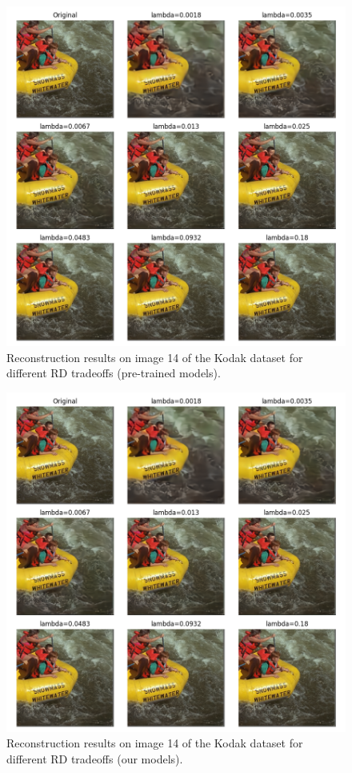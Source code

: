 \documentclass{article}
\begin{document}
\begin{figure}
  \centering
  \includegraphics[width=15cm]{../img/bdpsnr_kodak_14_pretrained.png}
  \caption[Reconstruction results on image 14 of the Kodak dataset for different RD tradeoffs (pre-trained models).]{Reconstruction results on image 14 of the Kodak dataset for different RD tradeoffs (pre-trained models).}
  \label{appendix:bdpsnr_1:a}
\end{figure}

\begin{figure}
  \centering
  \includegraphics[width=15cm]{../img/bdpsnr_kodak_14.png}
  \caption[Reconstruction results on image 14 of the Kodak dataset for different RD tradeoffs (our models).]{Reconstruction results on image 14 of the Kodak dataset for different RD tradeoffs (our models).}
  \label{appendix:bdpsnr_1:b}
\end{figure}
\end{document}
